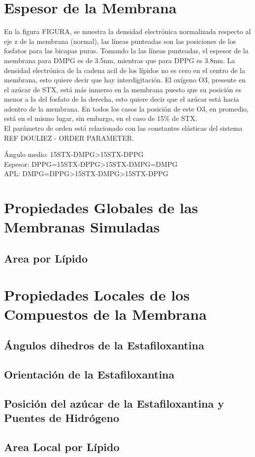 \section{Espesor de la Membrana}

En la figura FIGURA, se muestra la densidad electr\'{o}nica normalizada respecto al eje z de la membrana (normal), las l\'{i}neas punteadas son las posiciones de los fosfatos para las bicapas puras. Tomando la las l\'{i}neas punteadas, el espesor de la membrana para DMPG es de 3.5nm, mientras que para DPPG es 3.8nm. La densidad electr\'{o}nica de la cadena acil de los l\'{i}pidos no es cero en el centro de la membrana, esto quiere decir que hay interdigitaci\'{o}n. El ox\'{i}geno O3,  presente en el az\'{u}car de STX, est\'{a} m\'{a}s inmerso en la membrana puesto que su posici\'{o}n es menor a la del fosfato de la derecha, esto quiere decir que el az\'{u}car est\'{a} hacia adentro de la membrana. En todos los casos la posici\'{o}n de este O3, en promedio, est\'{a} en el mismo lugar, sin embargo, en el caso de 15\% de STX. \\

El par\'{a}metro de orden est\'{a} relacionado con las constantes el\'{a}sticas del sistema REF DOULIEZ - ORDER PARAMETER.

\'{A}ngulo medio: 15STX-DMPG>15STX-DPPG \\
Espesor: DPPG=15STX-DPPG>15STX-DMPG=DMPG \\
APL: DMPG=DPPG>15STX-DMPG>15STX-DPPG \\



\section{Propiedades Globales de las Membranas Simuladas}
\subsection{Area por L\'{i}pido}
\section{Propiedades Locales de los Compuestos de la Membrana}
\subsection{\'{A}ngulos dihedros de la Estafiloxantina}
\subsection{Orientaci\'{o}n de la Estafiloxantina}
\subsection{Posici\'{o}n del az\'{u}car  de la Estafiloxantina y Puentes de Hidr\'{o}geno}
\subsection{Area Local por L\'{i}pido}